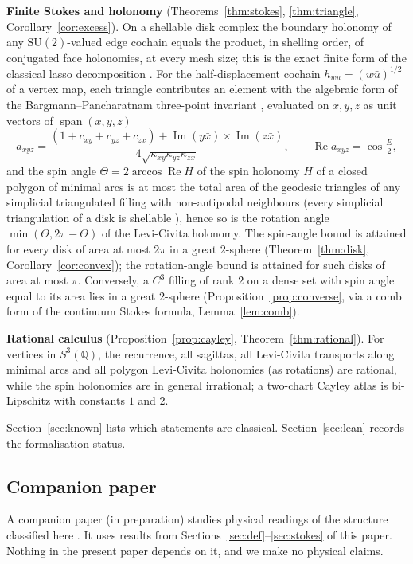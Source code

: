 \documentclass[11pt,reqno]{amsart}
\theoremstyle{definition}
\theoremstyle{remark}
\numberwithin{equation}{section}
\newcommand{\Q}{\mathbb{Q}}
\newcommand{\re}{\operatorname{Re}}
\newcommand{\im}{\operatorname{Im}}
\newcommand{\SU}{\mathrm{SU}}
\begin{document}
\noindent\textbf{Finite Stokes and holonomy} (Theorems~\ref{thm:stokes}, \ref{thm:triangle},
Corollary~\ref{cor:excess}).  On a shellable disk complex the boundary holonomy of any $\SU(2)$-valued edge cochain
equals the product, in shelling order, of conjugated face holonomies, at every mesh size; this is the exact finite form of
the classical lasso decomposition \cite{Bralic80,Levy03,Levy10}.  For the half-displacement cochain $h_{wu}=(w\bar u)^{1/2}$ of a
vertex map, each triangle contributes an element with the algebraic form of the Bargmann--Pancharatnam three-point invariant
\cite{SB88,MS93}, evaluated on $x,y,z$ as unit vectors of $\operatorname{span}(x,y,z)$
\[
a_{xyz}=\frac{(1+c_{xy}+c_{yz}+c_{zx})+\im(y\bar x)\times\im(z\bar x)}{4\sqrt{\kappa_{xy}\kappa_{yz}\kappa_{zx}}},
\qquad \re a_{xyz}=\cos\tfrac{E}{2},
\]
and the spin angle $\Theta=2\arccos\re H$ of the spin holonomy $H$ of a closed polygon of minimal arcs is at most the total area of the
geodesic triangles of any simplicial triangulated filling with non-antipodal neighbours (every simplicial
triangulation of a disk is shellable \cite{DK78}), hence so is the rotation angle $\min(\Theta,2\pi-\Theta)$ of the Levi-Civita holonomy.
The spin-angle bound is attained for every disk of area at most $2\pi$ in a great $2$-sphere (Theorem~\ref{thm:disk},
Corollary~\ref{cor:convex}); the rotation-angle bound is attained for such disks of area at most $\pi$.  Conversely, a $C^3$ filling of rank $2$ on a dense set with spin angle equal to its area lies in a great $2$-sphere
(Proposition~\ref{prop:converse}, via a comb form of the continuum Stokes formula, Lemma~\ref{lem:comb}).

\noindent\textbf{Rational calculus} (Proposition~\ref{prop:cayley}, Theorem~\ref{thm:rational}).  For
vertices in $S^3(\Q)$, the recurrence, all sagittas, all Levi-Civita transports along minimal arcs and all
polygon Levi-Civita holonomies (as rotations) are rational, while the spin holonomies are in general irrational; a two-chart Cayley atlas is bi-Lipschitz with constants $1$ and $2$.

Section~\ref{sec:known} lists which statements are classical.  Section~\ref{sec:lean} records the
formalisation status.

\subsection{Companion paper}
A companion paper (in preparation) studies physical readings of the
structure classified here \cite{Companion}.  It uses results from Sections~\ref{sec:def}--\ref{sec:stokes} of this paper.  Nothing in the
present paper depends on it, and we make no physical claims.
\end{document}
